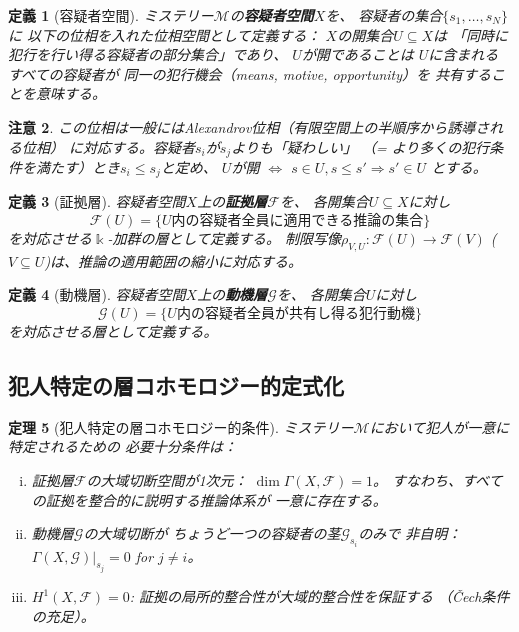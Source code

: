 \documentclass[12pt,twocolumn]{ltjsarticle}
\newtheorem{theorem}{定理}[section]
\newtheorem{definition}[theorem]{定義}
\newtheorem{remark}[theorem]{注意}
\newcommand{\Mys}{\mathcal{M}}
\newcommand{\kk}{\Bbbk}
\begin{document}
\begin{definition}[容疑者空間]
\label{def:suspect_space}
ミステリー$\Mys$の\textbf{容疑者空間}$X$を、
容疑者の集合$\{s_1, \ldots, s_N\}$に
以下の位相を入れた位相空間として定義する：
$X$の開集合$U \subseteq X$は
「同時に犯行を行い得る容疑者の部分集合」であり、
$U$が開であることは
$U$に含まれるすべての容疑者が
同一の犯行機会（means, motive, opportunity）を
共有することを意味する。
\end{definition}

\begin{remark}
この位相は一般にはAlexandrov位相（有限空間上の半順序から誘導される位相）
に対応する。容疑者$s_i$が$s_j$よりも「疑わしい」
（= より多くの犯行条件を満たす）とき$s_i \leq s_j$と定め、
$U$が開 $\Leftrightarrow$ $s \in U, s \leq s' \Rightarrow s' \in U$
とする。
\end{remark}

\begin{definition}[証拠層]
\label{def:evidence_sheaf}
容疑者空間$X$上の\textbf{証拠層}$\mathcal{F}$を、
各開集合$U \subseteq X$に対し
\begin{equation}
\mathcal{F}(U) = \{ \text{$U$内の容疑者全員に適用できる推論の集合} \}
\end{equation}
を対応させる$\kk$-加群の層として定義する。
制限写像$\rho_{V,U}: \mathcal{F}(U) \to \mathcal{F}(V)$
($V \subseteq U$)は、推論の適用範囲の縮小に対応する。
\end{definition}

\begin{definition}[動機層]
\label{def:motive_sheaf}
容疑者空間$X$上の\textbf{動機層}$\mathcal{G}$を、
各開集合$U$に対し
\begin{equation}
\mathcal{G}(U) = \{ \text{$U$内の容疑者全員が共有し得る犯行動機} \}
\end{equation}
を対応させる層として定義する。
\end{definition}

\subsection{犯人特定の層コホモロジー的定式化}

\begin{theorem}[犯人特定の層コホモロジー的条件]
\label{thm:sheaf_culprit}
ミステリー$\Mys$において犯人が一意に特定されるための
必要十分条件は：
\begin{enumerate}[(i)]
\item 証拠層$\mathcal{F}$の大域切断空間が1次元：
$\dim \Gamma(X, \mathcal{F}) = 1$。
すなわち、すべての証拠を整合的に説明する推論体系が
一意に存在する。

\item 動機層$\mathcal{G}$の大域切断が
ちょうど一つの容疑者の茎$\mathcal{G}_{s_i}$のみで
非自明：
$\Gamma(X, \mathcal{G})|_{s_j} = 0$ for $j \neq i$。

\item $H^1(X, \mathcal{F}) = 0$:
証拠の局所的整合性が大域的整合性を保証する
（\v{C}ech条件の充足）。
\end{enumerate}
\end{theorem}
\end{document}
